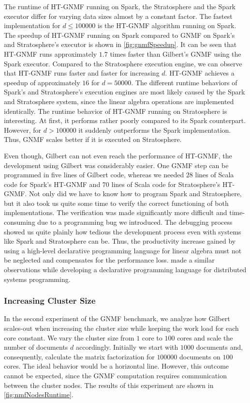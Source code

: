 The runtime of HT-GNMF running on Spark, the Stratosphere and the Spark executor differ for varying data sizes almost by a constant factor.
The fastest implementation for $d\le 100000$ is the HT-GNMF algorithm running on Spark.
The speedup of HT-GNMF running on Spark compared to GNMF on Spark's and Stratosphere's executor is shown in \cref{fig:gnmfSpeedup}.
It can be seen that HT-GNMF runs approximately $1.7$ times faster than Gilbert's GNMF using the Spark executor.
Compared to the Stratosphere execution engine, we can observe that HT-GNMF runs faster and faster for increasing $d$.
HT-GNMF achieves a speedup of approximately $16$ for $d=50000$.
The different runtime behaviors of Spark's and Stratosphere's execution engines are most likely caused by the Spark and Stratosphere system, since the linear algebra operations are implemented identically.
The runtime behavior of HT-GNMF running on Stratosphere is interesting.
At first, it performs rather poorly compared to its Spark counterpart.
However, for $d>100000$ it suddenly outperforms the Spark implementation.
Thus, GNMF scales better if it is executed on Stratosphere. 

Even though, Gilbert can not even reach the performance of HT-GNMF, the development using Gilbert was considerably easier.
One GNMF step can be programmed in five lines of Gilbert code, whereas we needed $28$ lines of Scala code for Spark's HT-GNMF and $70$ lines of Scala code for Stratosphere's HT-GNMF.
Not only did we have to know how to program Spark and Stratosphere, but it also took us quite some time to verify the correct functioning of both implementations.
The verification was made significantly more difficult and time-consuming due to a programming bug we introduced.
The debugging process showed us quite plainly how tedious the development process even with systems like Spark and Stratosphere can be.
Thus, the productivity increase gained by using a high-level declarative programming language for linear algebra must not be neglected and compensates for the performance loss.
\Textcite{alvaro:2010a} made a similar observations while developing a declarative programming language for distributed systems programming.

\subsubsection{Increasing Cluster Size}

In the second experiment of the GNMF benchmark, we analyze how Gilbert scales-out when increasing the cluster size while keeping the work load for each core constant.
We vary the cluster size from $1$ core to $100$ cores and scale the number of documents $d$ accordingly.
Initially we start with $1000$ documents and, consequently, calculate the matrix factorization for $100000$ documents on $100$ cores.
The ideal behavior would be a horizontal line.
However, this outcome cannot be expected, since the GNMF computation requires communication between the cluster nodes.
The results of this experiment are shown in \cref{fig:nmfNodesRuntime}.

